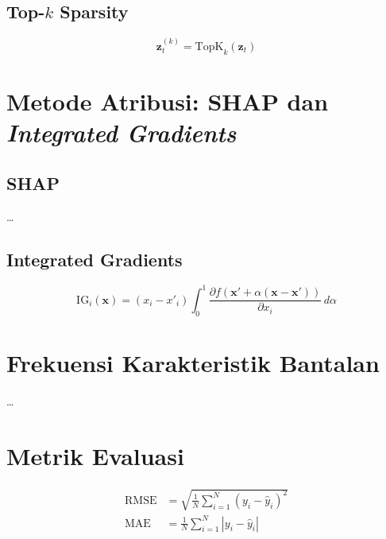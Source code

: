 \subsection{Top-$k$ Sparsity}
\label{subsec:bab3_topk}

\begin{equation}
\mathbf{z}_t^{(k)} = \mathrm{TopK}_k(\mathbf{z}_t)
\label{eq:bab3_topk}
\end{equation}

\section{Metode Atribusi: SHAP dan \emph{Integrated Gradients}}
\label{subsec:bab3_attribution}

\subsection{SHAP}
\label{subsec:bab3_shap}
\dots

\subsection{Integrated Gradients}
\label{subsec:bab3_ig}

\begin{equation}
\mathrm{IG}_i(\mathbf{x}) = (x_i - x'_i) \int_0^1 \frac{\partial f(\mathbf{x}' + \alpha(\mathbf{x}-\mathbf{x}'))}{\partial x_i}\, d\alpha
\label{eq:bab3_ig}
\end{equation}

\section{Frekuensi Karakteristik Bantalan}
\label{subsec:bab3_freq_char}

\dots

\section{Metrik Evaluasi}
\label{subsec:bab3_metrik}

\begin{align}
\text{RMSE} &= \sqrt{\frac{1}{N}\sum_{i=1}^{N}(y_i - \hat{y}_i)^2} \label{eq:bab3_rmse} \\
\text{MAE}  &= \frac{1}{N}\sum_{i=1}^{N}|y_i - \hat{y}_i| \label{eq:bab3_mae}
\end{align}

